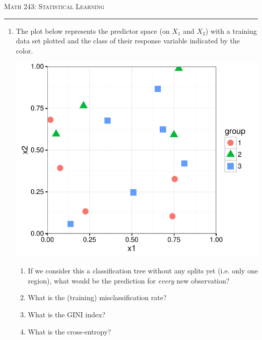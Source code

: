 \documentclass{article}\usepackage[]{graphicx}\usepackage[]{color}
\begin{document}
\begin{center}
\textsc{Math 243: Statistical Learning} \\
\noindent\rule{12cm}{0.4pt}
\end{center}




\begin{enumerate}
\setlength\itemsep{4em}

\item The plot below represents the predictor space (on $X_1$ and $X_2$) with a training data set plotted and the class of their response variable indicated by the color.

\begin{minipage}{.5\linewidth}
{\includegraphics[scale=0.6]{3-class-plot}}
\end{minipage}
\begin{minipage}{.5\linewidth}

\begin{enumerate}
\setlength\itemsep{3em}
\item If we consider this a classification tree without any splits yet (i.e. only one region), what would be the prediction for \emph{every} new observation?
\item What is the (training) misclassification rate?
\item What is the GINI index?
\item What is the cross-entropy?
\end{enumerate}

\end{minipage}


\end{enumerate}
\end{document}
